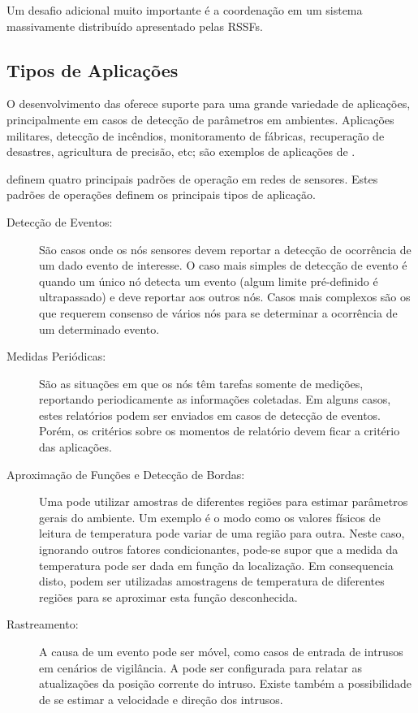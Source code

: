 Um desafio adicional muito importante é a coordenação em um sistema massivamente distribuído apresentado pelas RSSFs.

\subsection{Tipos de Aplicações}
O desenvolvimento das \rssfs oferece suporte para uma grande variedade de aplicações, principalmente em casos de detecção de parâmetros em ambientes. Aplicações militares, detecção de incêndios, monitoramento de fábricas, recuperação de desastres, agricultura de precisão, etc; são exemplos de aplicações de \rssfs.

\cite{Holger2005} definem quatro principais padrões de operação em redes de sensores. Estes padrões de operações definem os principais tipos de aplicação.

\begin{description}

\item[Detecção de Eventos:] São casos onde os nós sensores devem reportar a detecção de ocorrência de um dado evento de interesse. O caso mais simples de detecção de evento é quando um único nó detecta um evento (algum limite pré-definido é ultrapassado) e deve reportar aos outros nós. Casos mais complexos são os que requerem consenso de vários nós para se determinar a ocorrência de um determinado evento.

\item[Medidas Periódicas: ] São as situações em que os nós têm tarefas somente de medições, reportando periodicamente as informações coletadas. Em alguns casos, estes relatórios podem ser enviados em casos de detecção de eventos. Porém, os critérios sobre os momentos de relatório devem ficar a critério das aplicações.

\item[Aproximação de Funções e Detecção de Bordas:] Uma \rssf pode utilizar amostras de diferentes regiões para estimar parâmetros gerais do ambiente. Um exemplo é o modo como os valores físicos de leitura de temperatura pode variar de uma região para outra. Neste caso, ignorando outros fatores condicionantes, pode-se supor que a medida da temperatura pode ser dada em função da localização. Em consequencia disto, podem ser utilizadas amostragens de temperatura de diferentes regiões para se aproximar esta função desconhecida.

\item[Rastreamento:] A causa de um evento pode ser móvel, como casos de entrada de intrusos em cenários de vigilância. A \rssf pode ser configurada para relatar as atualizações da posição corrente do intruso. Existe também a possibilidade de se estimar a velocidade e direção dos intrusos. 

\end{description}


